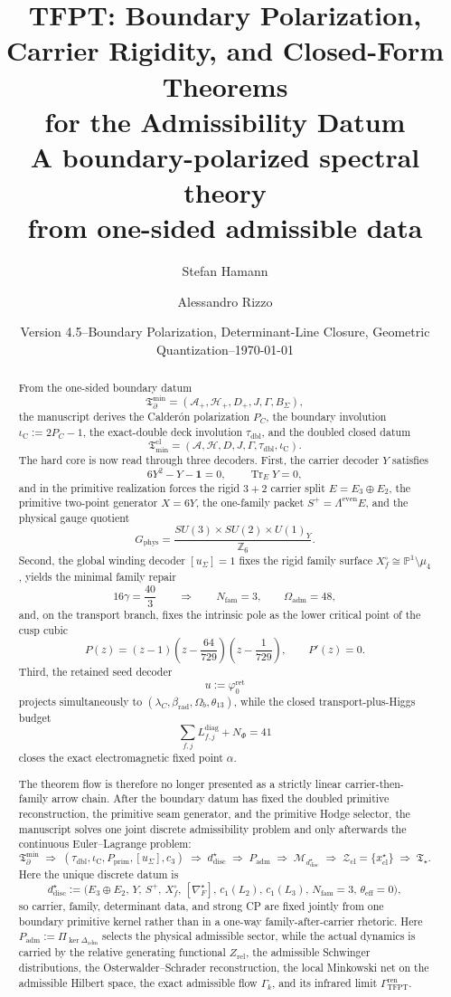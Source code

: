 \documentclass[11pt,a4paper]{article}
\title{%
    \color{tfptblue}\textbf{TFPT: Boundary Polarization, Carrier Rigidity, and Closed-Form Theorems\\for the Admissibility Datum}\\[0.6em]
    {\Large\color{tfptgray} A boundary-polarized spectral theory\\from one-sided admissible data}
}
\author{Stefan Hamann \and Alessandro Rizzo}
\date{{\normalsize\color{tfptgray}\sffamily Version 4.5\enspace--\enspace Boundary Polarization, Determinant-Line Closure, Geometric Quantization\enspace--\enspace\today}}
\theoremstyle{definition}
\theoremstyle{remark}
\DeclareMathOperator{\tr}{Tr}
\newcommand{\taudbl}{\tau_{\mathrm{dbl}}}
\newcommand{\iC}{\iota_{\mathrm C}}
\newcommand{\cthree}{c_3}
\newcommand{\Tmin}{\mathfrak T_{\mathrm{min}}}
\newcommand{\Tbound}{\mathfrak T_{\partial}^{\min}}
\newcommand{\Padm}{P_{\mathrm{adm}}}
\newcommand{\Pprim}{P_{\mathrm{prim}}}
\newcommand{\Tstar}{\mathfrak T_{\star}}
\begin{document}
\maketitle

\begin{abstract}
From the one-sided boundary datum
\[
\Tbound=(\mathcal A_+,\mathcal H_+,D_+,J,\Gamma,B_\Sigma),
\]
the manuscript derives the Calder\'on polarization $P_C$, the boundary involution
$\iC:=2P_C-1$, the exact-double deck involution $\taudbl$, and the doubled closed datum
\[
\Tmin^{\mathrm{cl}}=(\mathcal A,\mathcal H,D,J,\Gamma,\taudbl,\iC).
\]
The hard core is now read through three decoders. First, the carrier decoder $Y$ satisfies
\[
6Y^2-Y-\mathbf 1=0,
\qquad
\tr_EY=0,
\]
and in the primitive realization forces the rigid $3+2$ carrier split
$E=E_3\oplus E_2$, the primitive two-point generator $X=6Y$, the one-family packet
$S^+=\Lambda^{\mathrm{even}}E$, and the physical gauge quotient
\[
G_{\mathrm{phys}}
=
\frac{SU(3)\times SU(2)\times U(1)_Y}{\mathbb Z_6}.
\]
Second, the global winding decoder $[u_\Sigma]=1$ fixes the rigid family surface
$X_f^\circ\cong \mathbb P^1\setminus\mu_4$, yields the minimal family repair
\[
16\gamma=\frac{40}{3}
\qquad\Longrightarrow\qquad
N_{\mathrm{fam}}=3,
\qquad
\Omega_{\mathrm{adm}}=48,
\]
and, on the transport branch, fixes the intrinsic pole as the lower critical point of the cusp cubic
\[
P(z)=(z-1)\left(z-\frac{64}{729}\right)\left(z-\frac{1}{729}\right),
\qquad
P'(z)=0.
\]
Third, the retained seed decoder
\[
u:=\varphi_0^{\mathrm{ret}}
\]
projects simultaneously to $(\lambda_C,\beta_{\mathrm{rad}},\Omega_b,\theta_{13})$, while the
closed transport-plus-Higgs budget
\[
\sum_{f,j}L_{f,j}^{\mathrm{diag}}+N_\Phi=41
\]
closes the exact electromagnetic fixed point $\alpha$.

The theorem flow is therefore no longer presented as a strictly linear carrier-then-family arrow
chain. After the boundary datum has fixed the doubled primitive reconstruction, the primitive seam
generator, and the primitive Hodge selector, the manuscript solves one joint discrete admissibility
problem and only afterwards the continuous Euler--Lagrange problem:
\[
\Tbound
\;\Rightarrow\;
(\taudbl,\iC,\Pprim,[u_\Sigma],\cthree)
\;\Rightarrow\;
d^\star_{\mathrm{disc}}
\;\Rightarrow\;
\Padm
\;\Rightarrow\;
\mathcal M_{d^\star_{\mathrm{disc}}}
\;\Rightarrow\;
\mathcal Z_{\mathrm{cl}}=\{x^\star_{\mathrm{cl}}\}
\;\Rightarrow\;
\Tstar.
\]
Here the unique discrete datum is
\[
d^\star_{\mathrm{disc}}
:=
\bigl(
E_3\oplus E_2,\,
Y,\,
S^+,\,
X_f^\circ,\,
[\nabla_F^\star],\,
c_1(L_2),\,
c_1(L_3),\,
N_{\mathrm{fam}}=3,\,
\theta_{\mathrm{eff}}=0
\bigr),
\]
so carrier, family, determinant data, and strong CP are fixed jointly from one boundary primitive
kernel rather than in a one-way family-after-carrier rhetoric. Here $\Padm:=\Pi_{\ker
\Delta_{\mathrm{adm}}}$ selects the physical admissible sector, while the actual dynamics is
carried by the relative generating functional $Z_{\mathrm{rel}}$, the admissible Schwinger
distributions, the Osterwalder--Schrader reconstruction, the local Minkowski net on the admissible
Hilbert space, the exact admissible flow $\Gamma_k$, and its infrared limit
$\Gamma_{\mathrm{TFPT}}^{\mathrm{ren}}$.


\end{abstract}
\end{document}
